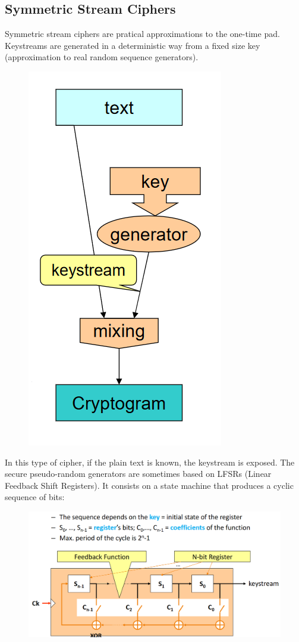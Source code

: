 \documentclass[10pt,a4paper]{report}
\begin{document}
\subsection{Symmetric Stream Ciphers}
Symmetric stream ciphers are pratical approximations to the one-time pad. Keystreams are generated in a deterministic way from a fixed size key (approximation to real random sequence generators).
\begin{figure}[H]
\centering
\includegraphics[scale=0.4]{1.png}
\end{figure}
In this type of cipher, if the plain text is known, the keystream is exposed. The secure pseudo-random generators are sometimes based on LFSRs (Linear Feedback Shift Registers). It consists on a state machine that produces a cyclic sequence of bits:
\begin{figure}[H]
\centering
\includegraphics[scale=0.4]{2.png}
\end{figure}
\end{document}
